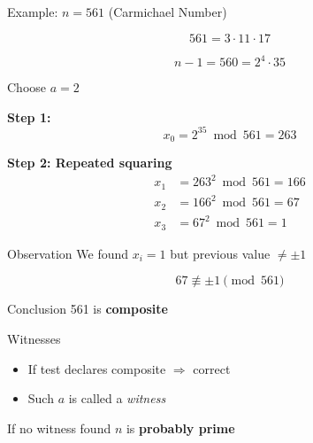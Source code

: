 \documentclass{beamer}
\newcommand{\bld}[1]{\textbf{#1}}
\newcommand{\itl}[1]{\textit{#1}}
\begin{document}

\begin{frame}{Example: $n = 561$ (Carmichael Number)}

\[
561 = 3 \cdot 11 \cdot 17
\]

\[
n - 1 = 560 = 2^4 \cdot 35
\]

Choose $a = 2$

\vspace{0.5em}

\textbf{Step 1:}
\[
x_0 = 2^{35} \bmod 561 = 263
\]

\vspace{0.5em}



\end{frame}
\begin{frame}
\textbf{Step 2: Repeated squaring}
\[
\begin{aligned}
    x_1 &= 263^2 \bmod 561 = 166 \\
    x_2 &= 166^2 \bmod 561 = 67 \\
    x_3 &= 67^2 \bmod 561 = 1
\end{aligned}
\]
\begin{block}{Observation}
We found $x_i = 1$ but previous value $\neq \pm1$
\end{block}

\[
67 \not\equiv \pm 1 \pmod{561}
\]

\vspace{0.5em}

\begin{block}{Conclusion}
561 is \bld{composite}
\end{block}

\end{frame}


\begin{frame}{Witnesses}

\begin{itemize}
    \item If test declares composite $\Rightarrow$ correct
    \item Such $a$ is called a \itl{witness}
\end{itemize}

\vspace{1em}

\begin{block}{If no witness found}
$n$ is \bld{probably prime}
\end{block}

\end{frame}
\end{document}
